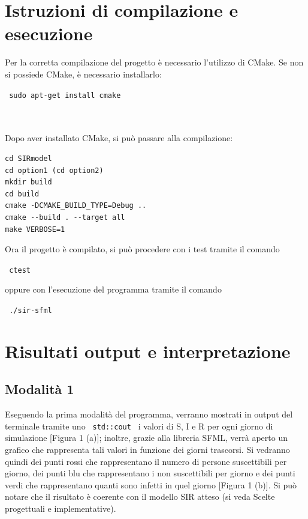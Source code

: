 \documentclass[a4paper,10 pt]{article}
\begin{document}
\section{Istruzioni di compilazione e esecuzione}

Per la corretta compilazione del progetto è necessario l'utilizzo di CMake. %
Se non si possiede CMake, è necessario installarlo:
\begin {quoting}
 \verb! sudo apt-get install cmake !
\end{quoting}
\ \\
\ \\
Dopo aver installato CMake, si può passare alla compilazione:
\begin {quoting}
 \begin {verbatim}
cd SIRmodel
cd option1 (cd option2)
mkdir build
cd build
cmake -DCMAKE_BUILD_TYPE=Debug ..
cmake --build . --target all
make VERBOSE=1 
\end{verbatim}
\end{quoting}
Ora il progetto è compilato, si può procedere con i test tramite il comando
\begin {quoting}
 \verb! ctest !
\end{quoting}
oppure con l'esecuzione del programma tramite il comando
\begin {quoting}
 \verb! ./sir-sfml !
\end{quoting}
\section{Risultati output e interpretazione}
\subsection{Modalità 1}
Eseguendo la prima modalità del programma, verranno mostrati in output del terminale tramite uno  \verb! std::cout ! i valori di S, I e R per ogni giorno di simulazione [Figura 1 (a)]; inoltre, grazie alla libreria SFML, verrà aperto un grafico che rappresenta tali valori in funzione dei giorni trascorsi. Si vedranno quindi dei punti rossi che rappresentano il numero di persone suscettibili per giorno, dei punti blu che rappresentano i non suscettibili per giorno e dei punti verdi che rappresentano quanti sono infetti in quel giorno [Figura 1 (b)]. Si può notare che il risultato è coerente con il modello SIR atteso (si veda Scelte progettuali e implementative).
\end{document}
